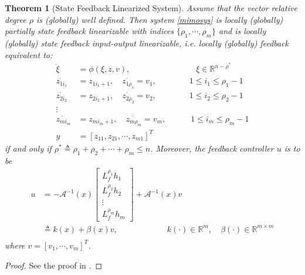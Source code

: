 \documentclass[11pt, a4paper, oneside, openany, reqno]{book}
\newtheorem{theorem}{Theorem}[chapter]
\theoremstyle{definition}
\theoremstyle{remark}
\numberwithin{equation}{chapter} %
\newcommand{\R}{\ensuremath{{\mathbb R}}}
\newcommand{\A}{\mathcal{A}}
\begin{document}
\begin{theorem}[State Feedback Linearized System]\label{mimolsysthm}
	Assume that the vector relative degree $ \rho $ is (globally) well defined.
	Then system \eqref{mimosys} is locally (globally) partially state feedback linearizable 
	with indices $\lbrace \rho_1, \cdots, \rho_m \rbrace$ 
	and is locally (globally) state feedback input-output linearizable, 
	i.e. locally (globally) feedback equivalent to:
	\begin{equation}\begin{split}\label{mimolform}
	\dot{\xi} &= \phi(\xi,z,v) , \qquad\qquad\qquad\qquad \xi \in \R^{n-\rho^*}\\
	\dot{z_{1i_1}}&= z_{1i_1+1} , \quad \dot{z_{1\rho_1}}= v_1,  \qquad\qquad 1 \leq i_1 \leq \rho_1 -1 \\
	\dot{z_{2i_2}}&= z_{2i_2+1} , \quad \dot{z_{2\rho_2}}= v_2,  \qquad\qquad 1 \leq i_2 \leq \rho_2 -1 \\
	\vdots \\
	\dot{z_{mi_m}}&= z_{mi_m+1} , \quad \dot{z_{m\rho_m}}= v_m,  \qquad\quad 1 \leq i_m \leq \rho_m -1 \\
	y &= \left[ z_{11}, z_{21}, \cdots , z_{m1}  \right]^T
	\end{split}\end{equation} 
	if and only if $ \rho^* \triangleq \rho_1 + \rho_2 + \cdots + \rho_m \leq n $.
	Moreover, the feedback controller $ u $ is to be 
	\begin{equation}\begin{split}\label{mimonctrl}
	u &= -\A^{-1}(x)
	\left[ \begin{array}{c}L_f^{\rho_1} h_1\\ L_f^{\rho_2} h_2\\ \vdots\\ 
	L_f^{\rho_m} h_m\end{array} \right] + \A^{-1}(x)v \\
	& \triangleq k(x)+\beta(x)v, \qquad\qquad\qquad k(\cdot) \in \R^{m}, \quad
	\beta(\cdot) \in \R^{m \times m} \\
	\end{split}\end{equation} 
	where $ v= \left[ v_1, \cdots, v_m \right]^T $.
\end{theorem}

\begin{proof}
	See the proof in \cite{khalil, isidori, marino}.
\end{proof}
\end{document}
